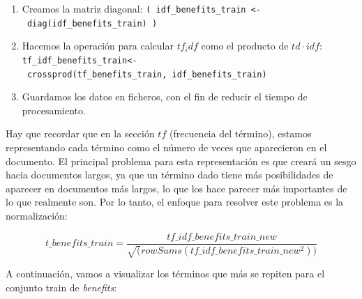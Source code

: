 \documentclass[spanish,]{article}
\newenvironment{Shaded}{\begin{snugshade}}{\end{snugshade}}
\newcommand{\KeywordTok}[1]{\textcolor[rgb]{0.13,0.29,0.53}{\textbf{#1}}}
\newcommand{\DataTypeTok}[1]{\textcolor[rgb]{0.13,0.29,0.53}{#1}}
\newcommand{\DecValTok}[1]{\textcolor[rgb]{0.00,0.00,0.81}{#1}}
\newcommand{\StringTok}[1]{\textcolor[rgb]{0.31,0.60,0.02}{#1}}
\newcommand{\CommentTok}[1]{\textcolor[rgb]{0.56,0.35,0.01}{\textit{#1}}}
\newcommand{\OperatorTok}[1]{\textcolor[rgb]{0.81,0.36,0.00}{\textbf{#1}}}
\newcommand{\NormalTok}[1]{#1}
\providecommand{\tightlist}{%
  \setlength{\itemsep}{0pt}\setlength{\parskip}{0pt}}
\begin{document}
\begin{enumerate}
\def\labelenumi{\arabic{enumi}.}
\tightlist
\item
  Creamos la matriz diagonal:
  \texttt{(\ idf\_benefits\_train\ \textless{}-\ diag(idf\_benefits\_train)\ )}
\item
  Hacemos la operación para calcular \(tf_idf\) como el producto de
  \(td \cdot idf\):
  \texttt{tf\_idf\_benefits\_train\textless{}-\ crossprod(tf\_benefits\_train,\ idf\_benefits\_train)}
\item
  Guardamos los datos en ficheros, con el fin de reducir el tiempo de
  procesamiento.
\end{enumerate}

Hay que recordar que en la sección \(tf\) (frecuencia del término),
estamos representando cada término como el número de veces que
aparecieron en el documento. El principal problema para esta
representación es que creará un sesgo hacia documentos largos, ya que un
término dado tiene más posibilidades de aparecer en documentos más
largos, lo que los hace parecer más importantes de lo que realmente son.
Por lo tanto, el enfoque para resolver este problema es la
normalización:

\[ t\_benefits\_train = \frac{tf\_idf\_benefits\_train\_new}{\sqrt(rowSums( tf\_idf\_benefits\_train\_new^2 ) )}\]

A continuación, vamos a visualizar los términos que más se repiten para
el conjunto train de \emph{benefits}:

\begin{Shaded}
\end{Shaded}
\end{document}
